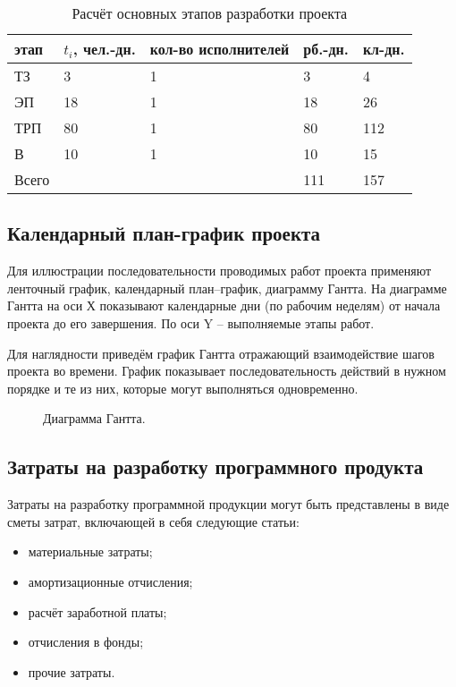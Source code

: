 \begin{table}[H]
    \caption{\label{tab:development-stages-calc}Расчёт основных этапов разработки проекта}
    \begin{tabular}[H]{|l|l|l|l|l|}
        \hline
        этап & $t_i$, чел.-дн. & кол-во исполнителей & рб.-дн. & кл-дн.\\
        \hline
        ТЗ & 3 & 1 & 3 & 4\\
        \hline
        ЭП & 18 & 1 & 18 & 26\\
        \hline
        ТРП & 80 & 1 & 80 & 112\\
        \hline
        В & 10 & 1 & 10 & 15\\
        \hline
        Всего &  &  &  111 & 157\\
        \hline
    \end{tabular}
\end{table}

\subsection{Календарный план-график проекта}
Для иллюстрации последовательности проводимых работ проекта применяют ленточный график, календарный план–график, диаграмму Гантта. На диаграмме Гантта на оси Х показывают календарные дни (по рабочим неделям) от начала проекта до его завершения. По оси Y – выполняемые этапы работ.

Для наглядности приведём график Гантта отражающий взаимодействие шагов проекта во времени. График показывает последовательность действий в нужном порядке и те из них, которые могут выполняться одновременно.
\begin{figure}[H]
    \caption{Диаграмма Гантта.}
    \label{img:gantt}
\end{figure}

\subsection{Затраты на разработку программного продукта}
Затраты на разработку программной продукции могут быть представлены в виде сметы затрат, включающей в себя следующие статьи:
\begin{itemize}
	\item материальные затраты;
	\item амортизационные отчисления;
	\item расчёт заработной платы;
	\item отчисления в фонды;
	\item прочие затраты.
\end{itemize}

